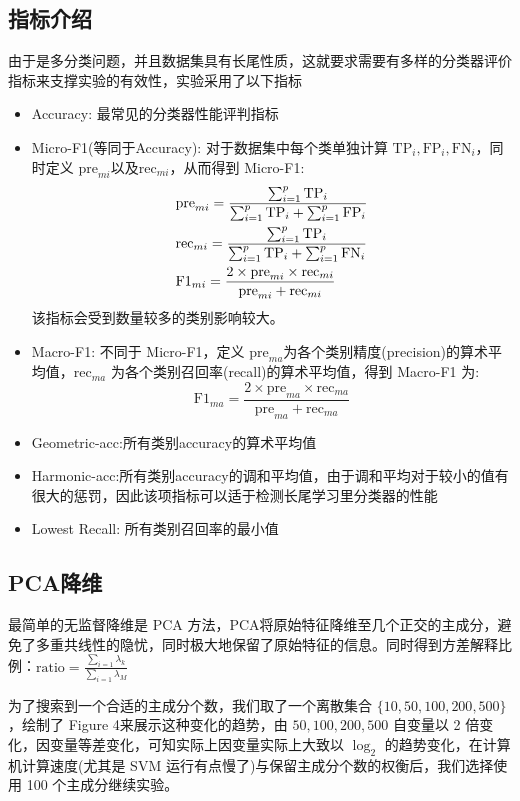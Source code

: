 \documentclass[fleqn]{Paquetes/RevDigMatEduInt}
\begin{document}
\subsection{指标介绍}
由于是多分类问题，并且数据集具有长尾性质，这就要求需要有多样的分类器评价指标来支撑实验的有效性，实验采用了以下指标
\begin{itemize}
	\item Accuracy: 最常见的分类器性能评判指标
	\item Micro-F1(等同于Accuracy): 对于数据集中每个类单独计算 $\mathrm{TP}_i,\mathrm{FP}_i,\mathrm{FN}_i$，同时定义 $\mathrm{pre}_{mi}$以及$\mathrm{rec}_{mi}$，从而得到 Micro-F1:
	\begin{align}
		&\mathrm{pre}_{mi} = \frac{\sum_{i = 1}^p \mathrm{TP}_i}{\sum_{i = 1}^p \mathrm{TP}_i + \sum_{i = 1}^p \mathrm{FP}_i}\notag\\
		&\mathrm{rec}_{mi} = \frac{\sum_{i = 1}^p \mathrm{TP}_i}{\sum_{i = 1}^p \mathrm{TP}_i + \sum_{i = 1}^p \mathrm{FN}_i}\notag\\
		&\mathrm{F1}_{mi} = \frac{2\times \mathrm{pre}_{mi}\times \mathrm{rec}_{mi}}{\mathrm{pre}_{mi} + \mathrm{rec}_{mi}}\notag
	\end{align}
	该指标会受到数量较多的类别影响较大。
	\item Macro-F1: 不同于 Micro-F1，定义 $\mathrm{pre}_{ma}$为各个类别精度(precision)的算术平均值，$\mathrm{rec}_{ma}$ 为各个类别召回率(recall)的算术平均值，得到 Macro-F1 为:
	$$
	\mathrm{F1}_{ma} = \frac{2 \times \mathrm{pre}_{ma} \times \mathrm{rec}_{ma}}{\mathrm{pre}_{ma} + \mathrm{rec}_{ma}}
	$$
	\item Geometric-acc:所有类别accuracy的算术平均值
	\item Harmonic-acc:所有类别accuracy的调和平均值，由于调和平均对于较小的值有很大的惩罚，因此该项指标可以适于检测长尾学习里分类器的性能
	\item Lowest Recall: 所有类别召回率的最小值
\end{itemize}
\subsection{PCA降维}
最简单的无监督降维是 PCA 方法\cite{3}，PCA将原始特征降维至几个正交的主成分，避免了多重共线性的隐忧，同时极大地保留了原始特征的信息。同时得到方差解释比例：$\mathrm{ratio}=\frac{\sum_{i=1}\lambda_{k}}{\sum_{i=1}\lambda_M}$

为了搜索到一个合适的主成分个数，我们取了一个离散集合 $\{10,50,100,200,500\}$，绘制了 Figure 4来展示这种变化的趋势，由 $50,100,200,500$ 自变量以 2 倍变化，因变量等差变化，可知实际上因变量实际上大致以 $\log_2$ 的趋势变化，在计算机计算速度(尤其是 SVM 运行有点慢了)与保留主成分个数的权衡后，我们选择使用 100 个主成分继续实验。
\end{document}
